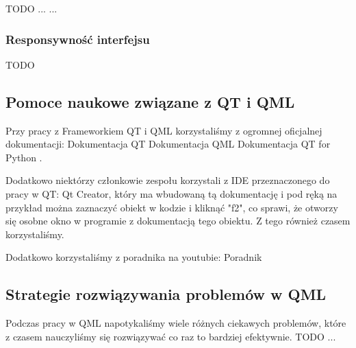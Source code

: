 TODO
...
...

\subsubsection{Responsywność interfejsu}
\label{sec:ResponsywnośćInterfejsu}
TODO

\subsection{Pomoce naukowe związane z QT i QML}
\label{sec:PomoceNaukoweQML}
Przy pracy z Frameworkiem QT i QML korzystaliśmy z ogromnej oficjalnej dokumentacji: 
Dokumentacja QT \cite{DokumentacjaQT}
Dokumentacja QML \cite{DokumentacjaQML}
Dokumentacja QT for Python \cite{DokumentacjaQtForPython}.

Dodatkowo niektórzy członkowie zespołu korzystali z IDE przeznaczonego do pracy w QT: Qt Creator, który ma wbudowaną tą dokumentację i pod ręką na przykład można zaznaczyć obiekt w kodzie i kliknąć "f2", co sprawi, że otworzy się osobne okno w programie z dokumentacją tego obiektu. Z tego również czasem korzystaliśmy.

Dodatkowo korzystaliśmy z poradnika na youtubie:
Poradnik \cite{PoradnikQMLYoutube}

\subsection{Strategie rozwiązywania problemów w QML}
\label{sec:StrategieRozwiązywaniaProblemówWQML}
Podczas pracy w QML napotykaliśmy wiele różnych ciekawych problemów, które z czasem nauczyliśmy się rozwiązywać co raz to bardziej efektywnie.
TODO ...
